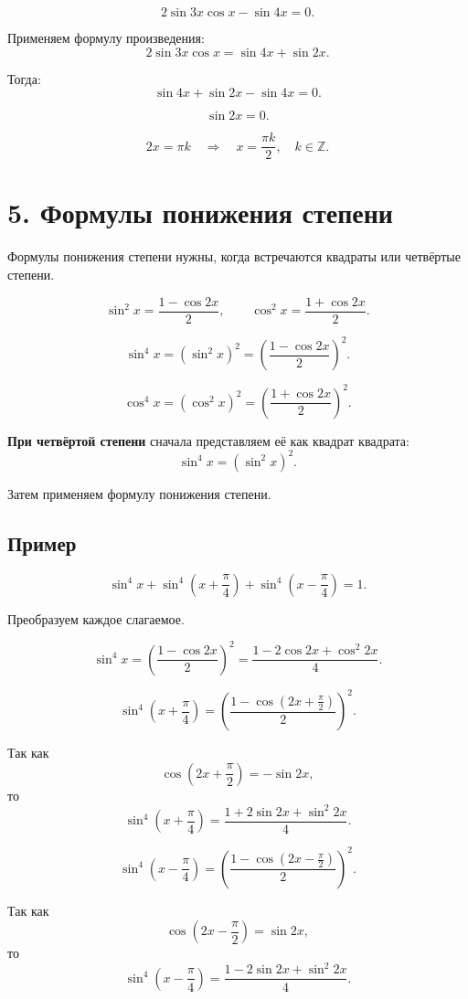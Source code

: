 \documentclass[a4paper,12pt]{article}
\newcommand{\sectionline}{\vspace{2mm}{\color{linegray}\hrule height 0.5pt}\vspace{2mm}}
\newcommand{\important}[1]{\textcolor{darkaccent}{\textbf{#1}}}
\newcommand{\Z}{\mathbb{Z}}
\begin{document}
\[
2\sin 3x\cos x-\sin 4x=0.
\]

Применяем формулу произведения:
\[
2\sin 3x\cos x
=
\sin 4x+\sin 2x.
\]

Тогда:
\[
\sin 4x+\sin 2x-\sin 4x=0.
\]

\[
\sin 2x=0.
\]

\[
2x=\pi k
\quad\Longrightarrow\quad
\boxed{x=\frac{\pi k}{2},\quad k\in\Z}.
\]

\sectionline

\section*{\textcolor{darkaccent}{5. Формулы понижения степени}}

Формулы понижения степени нужны, когда встречаются квадраты или четвёртые степени.

\[
\sin^2 x=\frac{1-\cos 2x}{2},
\qquad
\cos^2 x=\frac{1+\cos 2x}{2}.
\]

\[
\sin^4 x=\left(\sin^2 x\right)^2
=
\left(\frac{1-\cos 2x}{2}\right)^2.
\]

\[
\cos^4 x=\left(\cos^2 x\right)^2
=
\left(\frac{1+\cos 2x}{2}\right)^2.
\]

\important{При четвёртой степени} сначала представляем её как квадрат квадрата:
\[
\sin^4 x=(\sin^2 x)^2.
\]

Затем применяем формулу понижения степени.

\subsection*{\textcolor{darkaccent}{Пример}}

\[
\sin^4 x+\sin^4\left(x+\frac{\pi}{4}\right)+\sin^4\left(x-\frac{\pi}{4}\right)=1.
\]

Преобразуем каждое слагаемое.

\[
\sin^4 x
=
\left(\frac{1-\cos 2x}{2}\right)^2
=
\frac{1-2\cos 2x+\cos^2 2x}{4}.
\]

\[
\sin^4\left(x+\frac{\pi}{4}\right)
=
\left(
\frac{1-\cos\left(2x+\frac{\pi}{2}\right)}{2}
\right)^2.
\]

Так как
\[
\cos\left(2x+\frac{\pi}{2}\right)=-\sin 2x,
\]
то
\[
\sin^4\left(x+\frac{\pi}{4}\right)
=
\frac{1+2\sin 2x+\sin^2 2x}{4}.
\]

\[
\sin^4\left(x-\frac{\pi}{4}\right)
=
\left(
\frac{1-\cos\left(2x-\frac{\pi}{2}\right)}{2}
\right)^2.
\]

Так как
\[
\cos\left(2x-\frac{\pi}{2}\right)=\sin 2x,
\]
то
\[
\sin^4\left(x-\frac{\pi}{4}\right)
=
\frac{1-2\sin 2x+\sin^2 2x}{4}.
\]
\end{document}

